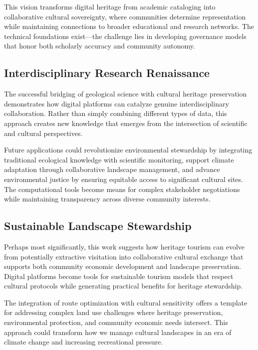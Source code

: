 This vision transforms digital heritage from academic cataloging into collaborative cultural sovereignty, where communities determine representation while maintaining connections to broader educational and research networks. The technical foundations exist—the challenge lies in developing governance models that honor both scholarly accuracy and community autonomy.

\subsection{Interdisciplinary Research Renaissance}
\label{subsec:research_renaissance}

The successful bridging of geological science with cultural heritage preservation demonstrates how digital platforms can catalyze genuine interdisciplinary collaboration. Rather than simply combining different types of data, this approach creates new knowledge that emerges from the intersection of scientific and cultural perspectives.

Future applications could revolutionize environmental stewardship by integrating traditional ecological knowledge with scientific monitoring, support climate adaptation through collaborative landscape management, and advance environmental justice by ensuring equitable access to significant cultural sites. The computational tools become means for complex stakeholder negotiations while maintaining transparency across diverse community interests.

\subsection{Sustainable Landscape Stewardship}
\label{subsec:sustainable_stewardship}

Perhaps most significantly, this work suggests how heritage tourism can evolve from potentially extractive visitation into collaborative cultural exchange that supports both community economic development and landscape preservation. Digital platforms become tools for sustainable tourism models that respect cultural protocols while generating practical benefits for heritage stewardship.

The integration of route optimization with cultural sensitivity offers a template for addressing complex land use challenges where heritage preservation, environmental protection, and community economic needs intersect. This approach could transform how we manage cultural landscapes in an era of climate change and increasing recreational pressure.

